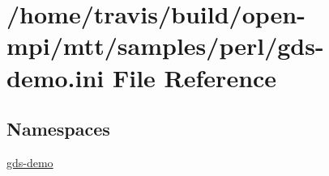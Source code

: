 \hypertarget{gds-demo_8ini}{\section{/home/travis/build/open-\/mpi/mtt/samples/perl/gds-\/demo.ini File Reference}
\label{gds-demo_8ini}
}
\subsection*{Namespaces}
\begin{DoxyCompactItemize}
\item 
\hyperlink{namespacegds-demo}{gds-\/demo}
\end{DoxyCompactItemize}
